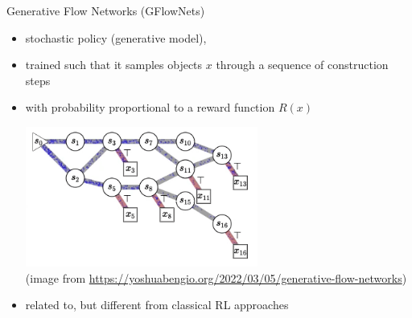 \documentclass[aspectratio=1610]{beamer}
\newcommand{\important}[1]{{\color{green!60!black}#1}}
\renewcommand{\footnotesize}{\scriptsize}
\begin{document}
	
	



\begin{frame}{Generative Flow Networks (GFlowNets)}

	\citet{bengio-21a}
	
	\begin{itemize}
		\item \important{stochastic policy} (generative model),
		\item trained such that it samples objects $x$ through a sequence of construction steps
		\item with probability \important{proportional to a reward function $R(x)$}

	\includegraphics[width=0.6\textwidth]{graphics/gflownet_anim.png}\\
	{\footnotesize (image from \url{https://yoshuabengio.org/2022/03/05/generative-flow-networks})}

	\item related to, but different from classical RL approaches
	\end{itemize}
\end{frame}
\end{document}
